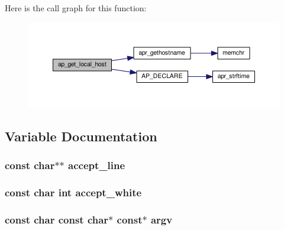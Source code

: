 Here is the call graph for this function\+:
\nopagebreak
\begin{figure}[H]
\begin{center}
\leavevmode
\includegraphics[width=350pt]{group__APACHE__CORE__DAEMON_ga2dd9b90f73ee5472ab8217dc8cafb00a_cgraph}
\end{center}
\end{figure}




\subsection{Variable Documentation}
\subsubsection[{\texorpdfstring{accept\+\_\+line}{accept_line}}]{\setlength{\rightskip}{0pt plus 5cm}const char$\ast$$\ast$ accept\+\_\+line}\hypertarget{group__APACHE__CORE__DAEMON_gaca8a5887bf5a94e101c9ce2b8bab526d}{}\label{group__APACHE__CORE__DAEMON_gaca8a5887bf5a94e101c9ce2b8bab526d}
\subsubsection[{\texorpdfstring{accept\+\_\+white}{accept_white}}]{\setlength{\rightskip}{0pt plus 5cm}const char {\bf int} accept\+\_\+white}\hypertarget{group__APACHE__CORE__DAEMON_gaac2f0c94cf6ca416699c123d912ccf10}{}\label{group__APACHE__CORE__DAEMON_gaac2f0c94cf6ca416699c123d912ccf10}
\subsubsection[{\texorpdfstring{argv}{argv}}]{\setlength{\rightskip}{0pt plus 5cm}const char const char$\ast$ const$\ast$ argv}\hypertarget{group__APACHE__CORE__DAEMON_gac02589c01422875b91f377e25ee991e3}{}\label{group__APACHE__CORE__DAEMON_gac02589c01422875b91f377e25ee991e3}
